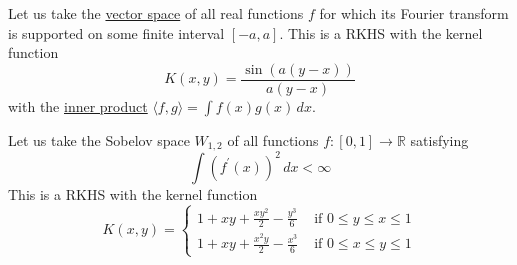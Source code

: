   \begin{example}
    \label{ex:fourier-basis}
    Let us take the \hyperref[lin-def:vector-space]{vector space} of all real functions $f$ for which its Fourier transform is supported on some finite interval $[-a, a]$. This is a RKHS with the kernel function 
    \begin{equation}
      K(x, y) = \frac{\sin(a(y - x))}{a(y - x)}
    \end{equation}
    with the \hyperref[lin-def:inner-product]{inner product} $\langle f, g \rangle = \int f(x) g(x) \,dx$.
  \end{example}

  \begin{example}
    \label{ex:some-sobelov-spaces-are-rkhs}
    Let us take the Sobelov space $W_{1, 2}$ of all functions $f: [0, 1] \rightarrow \mathbb{R}$ satisfying 
    \begin{equation}
      \int (f^\prime (x))^2 \,dx < \infty
    \end{equation} 
    This is a RKHS with the kernel function 
    \begin{equation}
      K(x, y) = \begin{cases} 1 + xy + \frac{xy^2}{2} - \frac{y^3}{6} & \text{ if } 0 \leq y \leq x \leq 1 \\
        1 + xy + \frac{x^2 y}{2} - \frac{x^3}{6} & \text{ if } 0 \leq x \leq y \leq 1 \end{cases}
    \end{equation}
  \end{example}

